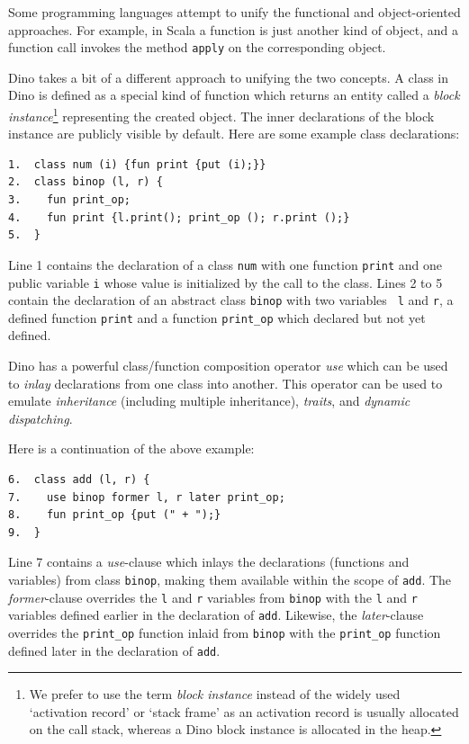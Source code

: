 \documentclass[preprint]{sigplanconf}
\begin{document}
Some programming languages attempt to unify the functional and
object-oriented approaches.  For example, in Scala a function is just
another kind of object,
 and a function call invokes the method {\tt apply} on the
corresponding object.

Dino takes a bit of a different approach to unifying the two concepts.
  A class in Dino is defined as %
a special
kind of function which returns an entity called a \emph{block instance}\footnote{We prefer to use the
term \emph{block instance} instead of the widely used `activation record' or `stack frame' 
as an activation record is usually allocated on the call stack, whereas a Dino block 
instance is allocated in the heap.} representing the created
object. The inner declarations of the block instance are publicly visible by default.
Here are some example class declarations:

{\footnotesize
\begin{verbatim}
1.  class num (i) {fun print {put (i);}}
2.  class binop (l, r) {
3.    fun print_op;
4.    fun print {l.print(); print_op (); r.print ();}
5.  }
\end{verbatim}
}

Line 1 contains the declaration of a class {\tt num} with one function {\tt print} and one public variable {\tt i} whose value is initialized by the call to the class.  Lines 2 to 5
contain the declaration of an abstract class {\tt binop} with two variables {\tt
l} and {\tt r}, a defined function {\tt print} and a function {\tt print\_op} which declared but not yet defined.

Dino has a powerful class/function composition operator
\emph{use} which can be used to \emph{inlay} declarations from one class into another. 
This operator can be used to emulate \emph{inheritance} (including multiple inheritance), \emph{traits}, and
\emph{dynamic dispatching}. 

Here is a continuation of the above example:

{\footnotesize
\begin{verbatim}
6.  class add (l, r) {
7.    use binop former l, r later print_op;
8.    fun print_op {put (" + ");}
9.  }
\end{verbatim}
}

Line 7 contains a \emph{use}-clause which inlays the
declarations (functions and variables) from class {\tt binop}, making them available within the scope of {\tt add}. 
The \emph{former}-clause overrides the {\tt l} and {\tt r} variables from {\tt binop}
with the {\tt l} and {\tt r} variables defined earlier in the declaration of {\tt add}.
Likewise, the \emph{later}-clause overrides the {\tt print\_op} function inlaid from {\tt binop} with the {\tt print\_op} function defined later in the declaration of {\tt add}.
\end{document}
